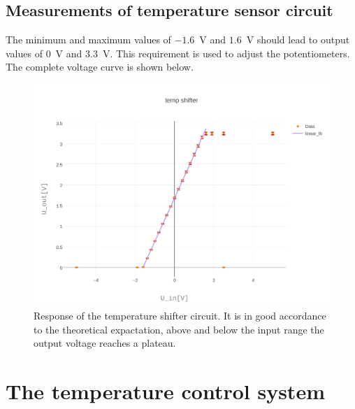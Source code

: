 \documentclass[12pt]{scrartcl}
\begin{document}
      \subsection{Measurements of temperature sensor circuit}
        The minimum and maximum values of $-1.6$~V and $1.6$~V should lead to
        output values of $0$~V and $3.3$~V. This requirement is used to adjust
        the potentiometers. The complete voltage curve is shown below.
        \begin{figure}[H]
          \centering
          \includegraphics[width = 0.55
          \textwidth]{./plots/plot_image(3)}
          \caption{Response of the temperature shifter circuit. It is in good
          accordance to the theoretical expactation, above and below the
          input range the output voltage reaches a plateau.}
          \label{fig9}
        \end{figure}
    \section{The temperature control system}
\end{document}
